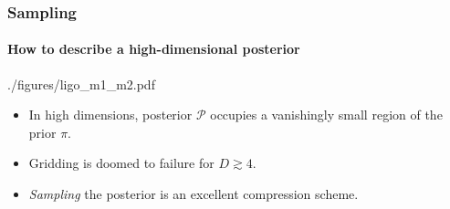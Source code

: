 \documentclass[%
]{beamer}
\newcommand{\posterior}{\mathcal{P}}
\newcommand{\prior}{\pi}
\begin{document}
%
%
%




\begin{frame}
    \frametitle{Sampling}
    \framesubtitle{How to describe a high-dimensional posterior}

	\begin{figright}{./figures/ligo_m1_m2.pdf}
		\begin{itemize}
          \item In high dimensions, posterior $\posterior$ occupies a vanishingly small region of the prior $\prior$.
          \item Gridding is doomed to failure for $D\gtrsim4$.
          \item {\em Sampling\/} the posterior is an excellent compression scheme.
		\end{itemize}
	\end{figright}
 
\end{frame}
\end{document}
